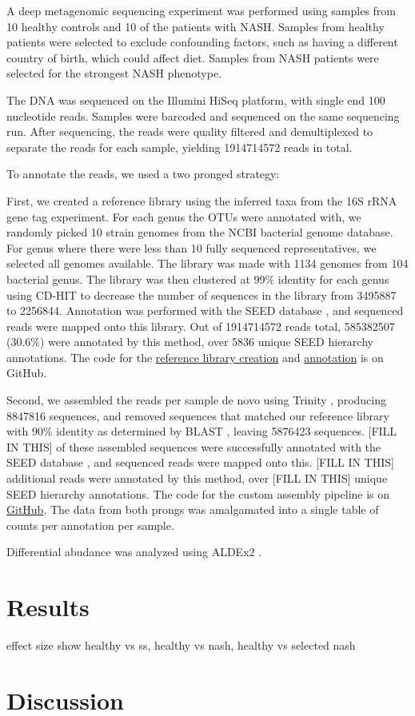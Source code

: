A deep metagenomic sequencing experiment was performed using samples from 10 healthy controls and 10 of the patients with NASH. Samples from healthy patients were selected to exclude confounding factors, such as having a different country of birth, which could affect diet. Samples from NASH patients were selected for the strongest NASH phenotype.

The DNA was sequenced on the Illumini HiSeq platform, with single end 100 nucleotide reads. Samples were barcoded and sequenced on the same sequencing run. After sequencing, the reads were quality filtered and demultiplexed to separate the reads for each sample, yielding 1914714572 reads in total.

To annotate the reads, we used a two pronged strategy:

First, we created a reference library using the inferred taxa from the 16S rRNA gene tag experiment. For each genus the OTUs were annotated with, we randomly picked 10 strain genomes from the NCBI bacterial genome database. For genus where there were less than 10 fully sequenced representatives, we selected all genomes available. The library was made with 1134 genomes from 104 bacterial genus. The library was then clustered at 99\% identity for each genus using CD-HIT \cite{li2006cd} to decrease the number of sequences in the library from 3495887 to 2256844. Annotation was performed with the SEED database \cite{overbeek2005subsystems}, and sequenced reads were mapped onto this library. Out of 1914714572 reads total, 585382507 (30.6\%) were annotated by this method, over 5836 unique SEED hierarchy annotations. The code for the \href{https://github.com/ruthgrace/make_functional_mapping_library}{reference library creation} and \href{https://github.com/ruthgrace/mapping_library_annotated_counts}{annotation} is on GitHub.

Second, we assembled the reads per sample de novo using Trinity \cite{haas2013novo}, producing 8847816 sequences, and removed sequences that matched our reference library with 90\% identity as determined by BLAST \cite{altschul1990basic}, leaving 5876423 sequences. [FILL IN THIS] of these assembled sequences were successfully annotated with the SEED database \cite{overbeek2005subsystems}, and sequenced reads were mapped onto this. [FILL IN THIS] additional reads were annotated by this method, over [FILL IN THIS] unique SEED hierarchy annotations. The code for the custom assembly pipeline is on \href{https://github.com/ruthgrace/exploring_nafld_assembly}{GitHub}. The data from both prongs was amalgamated into a single table of counts per annotation per sample.

Differential abudance was analyzed using ALDEx2 \cite{fernandes2014unifying}.

\section{Results}

effect size
show healthy vs ss, healthy vs nash, healthy vs selected nash

\section{Discussion}